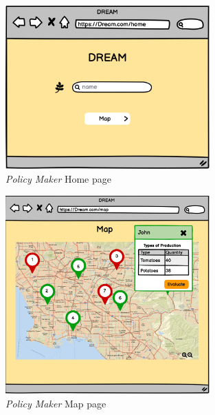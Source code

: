 \begin{figure}[H]
    \begin{center}
    \includegraphics[width=0.7\textwidth]{mockups/PMHome.png}
    \caption{\emph{Policy Maker} Home page}
    \label{fig:PMhomepage}
    \end{center}
\end{figure}

\begin{figure}[H]
    \begin{center}
    \includegraphics[width=0.7\textwidth]{mockups/PMMap.png}
    \caption{\emph{Policy Maker} Map page}
    \label{fig:PMmap}
    \end{center}
\end{figure}

